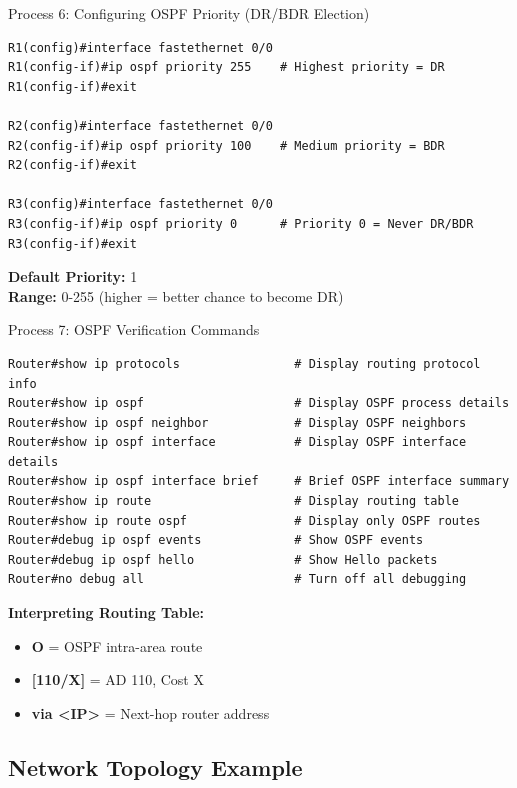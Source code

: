 \documentclass[12pt,a4paper]{article}
\begin{document}
\begin{commandbox}{Process 6: Configuring OSPF Priority (DR/BDR Election)}
\begin{lstlisting}
R1(config)#interface fastethernet 0/0
R1(config-if)#ip ospf priority 255    # Highest priority = DR
R1(config-if)#exit

R2(config)#interface fastethernet 0/0
R2(config-if)#ip ospf priority 100    # Medium priority = BDR
R2(config-if)#exit

R3(config)#interface fastethernet 0/0
R3(config-if)#ip ospf priority 0      # Priority 0 = Never DR/BDR
R3(config-if)#exit
\end{lstlisting}

\textbf{Default Priority:} 1\\
\textbf{Range:} 0-255 (higher = better chance to become DR)
\end{commandbox}

\begin{commandbox}{Process 7: OSPF Verification Commands}
\begin{lstlisting}
Router#show ip protocols                # Display routing protocol info
Router#show ip ospf                     # Display OSPF process details
Router#show ip ospf neighbor            # Display OSPF neighbors
Router#show ip ospf interface           # Display OSPF interface details
Router#show ip ospf interface brief     # Brief OSPF interface summary
Router#show ip route                    # Display routing table
Router#show ip route ospf               # Display only OSPF routes
Router#debug ip ospf events             # Show OSPF events
Router#debug ip ospf hello              # Show Hello packets
Router#no debug all                     # Turn off all debugging
\end{lstlisting}

\textbf{Interpreting Routing Table:}
\begin{itemize}[noitemsep]
    \item \textbf{O} = OSPF intra-area route
    \item \textbf{[110/X]} = AD 110, Cost X
    \item \textbf{via <IP>} = Next-hop router address
\end{itemize}
\end{commandbox}

\subsection{Network Topology Example}
\end{document}
